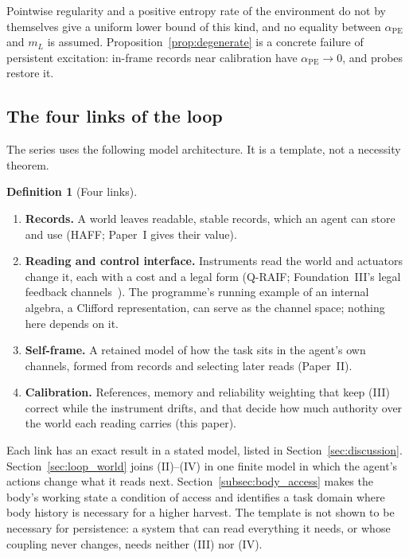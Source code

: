 \documentclass[12pt]{article}
\theoremstyle{definition}
\newtheorem{definition}[theorem]{Definition}
\begin{document}
Pointwise regularity and a positive entropy rate of the environment do not by themselves give a uniform lower bound of this kind, and no equality between $\alpha_{\mathrm{PE}}$ and $m_L$ is assumed. Proposition~\ref{prop:degenerate} is a concrete failure of persistent excitation: in-frame records near calibration have $\alpha_{\mathrm{PE}}\to0$, and probes restore it.

\subsection{The four links of the loop}
\label{subsec:four_part}

The series uses the following model architecture. It is a template, not a necessity theorem.

\begin{definition}[Four links]
\label{def:four_part_template}
\begin{enumerate}
\item[\textup{(I)}] \textbf{Records.} A world leaves readable, stable records, which an agent can store and use (HAFF; Paper~I gives their value).
\item[\textup{(II)}] \textbf{Reading and control interface.} Instruments read the world and actuators change it, each with a cost and a legal form (Q-RAIF; Foundation~III's legal feedback channels~\cite{Liu2026FIII}). The programme's running example of an internal algebra, a Clifford representation, can serve as the channel space; nothing here depends on it.
\item[\textup{(III)}] \textbf{Self-frame.} A retained model of how the task sits in the agent's own channels, formed from records and selecting later reads (Paper~II).
\item[\textup{(IV)}] \textbf{Calibration.} References, memory and reliability weighting that keep (III) correct while the instrument drifts, and that decide how much authority over the world each reading carries (this paper).
\end{enumerate}
\end{definition}

Each link has an exact result in a stated model, listed in Section~\ref{sec:discussion}. Section~\ref{sec:loop_world} joins (II)--(IV) in one finite model in which the agent's actions change what it reads next. Section~\ref{subsec:body_access} makes the body's working state a condition of access and identifies a task domain where body history is necessary for a higher harvest. The template is not shown to be necessary for persistence: a system that can read everything it needs, or whose coupling never changes, needs neither (III) nor (IV).
\end{document}

